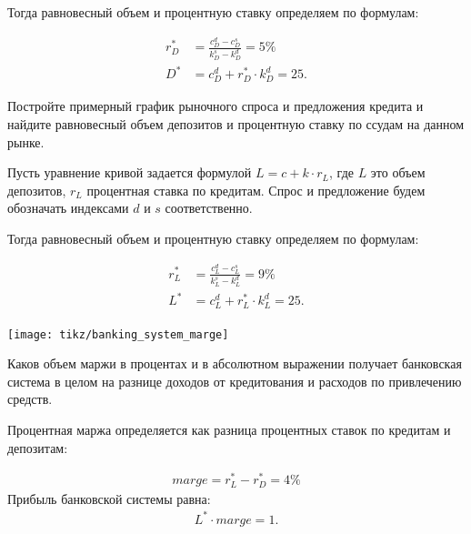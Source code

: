 \documentclass[12pt, table, a4paper,twoside]{exam}
\begin{document}
\begin{questions}
\begin{subparts}
\begin{solution}[12em]
		Тогда равновесный объем и процентную ставку определяем по формулам:
		
		\begin{align*}
		r_D^*&=\frac{c_D^d-c_D^s}{k_D^s-k_D^d}=5\%\\
		D^*&= c_D^d + r_D^* \cdot k_D^d = 25.
		\end{align*}
		
	\end{solution}
	
	\subpart[5] Постройте примерный график рыночного спроса и предложения кредита и найдите равновесный объем депозитов и процентную ставку по ссудам на данном рынке.
	
	\begin{solution}[12em]
		
		Пусть уравнение кривой задается формулой $L=c+k \cdot r_L$, где $L$ это объем депозитов, $r_L$ процентная ставка по кредитам. Спрос и предложение будем обозначать индексами $d$ и $s$ соответственно.
		
		Тогда равновесный объем и процентную ставку определяем по формулам:
		
		\begin{align*}
		r_L^*&=\frac{c_L^d-c_L^s}{k_L^s-k_L^d}=9\%\\
		L^*&= c_L^d + r_L^* \cdot k_L^d = 25.
		\end{align*}
		
		\centering
		\texttt{[image: tikz/banking\_system\_marge]}

		\raggedright
		
	\end{solution}

	\subpart[5] Каков объем маржи в процентах и в абсолютном выражении получает банковская система в целом на разнице доходов от кредитования и расходов по привлечению средств.

	\begin{solution}[12em]
		
		Процентная маржа определяется как разница процентных ставок по кредитам и депозитам:
		
		\begin{align*}
		marge=r_L^*-r_D^*=4\%
		\end{align*}
		Прибыль банковской системы равна:
		\begin{align*}
		L^* \cdot marge = 1.
		\end{align*}
		
	\end{solution}
	

\end{subparts}
\end{questions}
\end{document}
